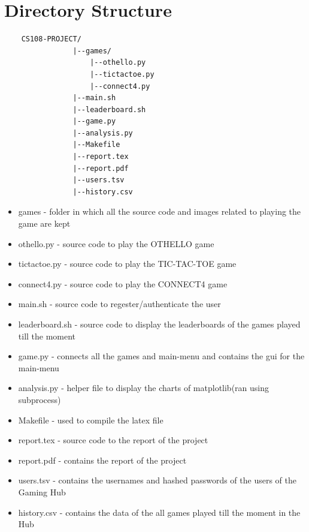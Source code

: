 \documentclass[12pt]{article}
\begin{document}
\section{Directory Structure}
\begin{verbatim}
    CS108-PROJECT/
                |--games/
                    |--othello.py
                    |--tictactoe.py
                    |--connect4.py
                |--main.sh
                |--leaderboard.sh
                |--game.py
                |--analysis.py
                |--Makefile
                |--report.tex
                |--report.pdf
                |--users.tsv
                |--history.csv

\end{verbatim}
\begin{itemize}
    \item games - folder in which all the source code and images related to playing the game are kept
    \item othello.py - source code to play the OTHELLO game
    \item tictactoe.py - source code to play the TIC-TAC-TOE game
    \item connect4.py - source code to play the CONNECT4 game
    \item main.sh - source code to regester/authenticate the user
    \item leaderboard.sh - source code to display the leaderboards of the games played till the moment
    \item game.py - connects all the games and main-menu and contains the gui for the main-menu
    \item analysis.py - helper file to display the charts of matplotlib(ran using subprocess)
    \item Makefile - used to compile the latex file
    \item report.tex - source code to the report of the project
    \item report.pdf - contains the report of the project
    \item users.tsv - contains the usernames and hashed passwords of the users of the Gaming Hub
    \item history.csv - contains the data of the all games played till the moment in the Hub
\end{itemize}
\end{document}
